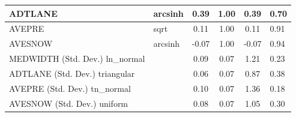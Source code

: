 \begin{table}
\begin{center}
\begin{tabular}{|l|l|c|c|c|l|}
			\hline
			ADTLANE & arcsinh & 0.39 & 1.00 & 0.39 & 0.70 \\
			\hline
			AVEPRE & sqrt & 0.11 & 1.00 & 0.11 & 0.91 \\
			\hline
			AVESNOW & arcsinh & -0.07 & 1.00 & -0.07 & 0.94 \\
			\hline
			MEDWIDTH (Std. Dev.) ln_normal &  & 0.09 & 0.07 & 1.21 & 0.23 \\
			\hline
			ADTLANE (Std. Dev.) triangular &  & 0.06 & 0.07 & 0.87 & 0.38 \\
			\hline
			AVEPRE (Std. Dev.) tn_normal &  & 0.10 & 0.07 & 1.36 & 0.18 \\
			\hline
			AVESNOW (Std. Dev.) uniform &  & 0.08 & 0.07 & 1.05 & 0.30 \\
			\hline
		\end{tabular}
	\end{center}
\end{table}